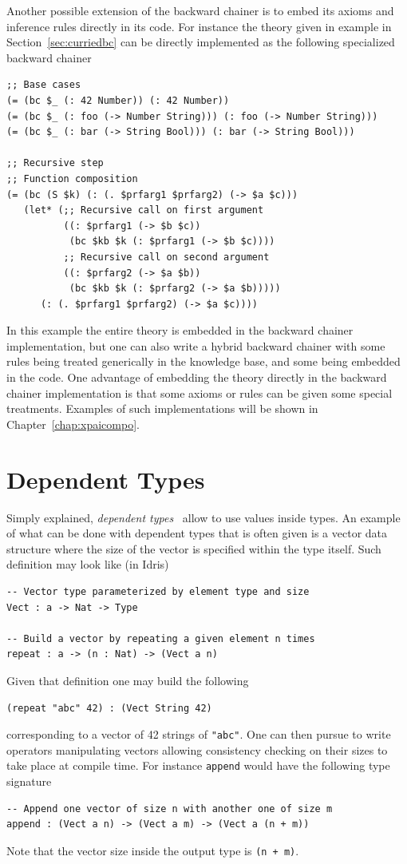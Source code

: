 \documentclass[]{report}
\begin{document}
Another possible extension of the backward chainer is to embed its
axioms and inference rules directly in its code.  For instance the
theory given in example in Section~\ref{sec:curriedbc} can be directly
implemented as the following specialized backward chainer

\begin{verbatim}
;; Base cases
(= (bc $_ (: 42 Number)) (: 42 Number))
(= (bc $_ (: foo (-> Number String))) (: foo (-> Number String)))
(= (bc $_ (: bar (-> String Bool))) (: bar (-> String Bool)))

;; Recursive step
;; Function composition
(= (bc (S $k) (: (. $prfarg1 $prfarg2) (-> $a $c)))
   (let* (;; Recursive call on first argument
          ((: $prfarg1 (-> $b $c))
           (bc $kb $k (: $prfarg1 (-> $b $c))))
          ;; Recursive call on second argument
          ((: $prfarg2 (-> $a $b))
           (bc $kb $k (: $prfarg2 (-> $a $b)))))
      (: (. $prfarg1 $prfarg2) (-> $a $c))))
\end{verbatim}
In this example the entire theory is embedded in the backward chainer
implementation, but one can also write a hybrid backward chainer with
some rules being treated generically in the knowledge base, and some
being embedded in the code.  One advantage of embedding the theory
directly in the backward chainer implementation is that some axioms or
rules can be given some special treatments.  Examples of such
implementations will be shown in Chapter~\ref{chap:xpaicompo}.

\section{Dependent Types}

Simply explained, \emph{dependent types}~\cite{MartinLof1980} allow to
use values inside types.  An example of what can be done with
dependent types that is often given is a vector data structure where
the size of the vector is specified within the type itself.  Such
definition may look like (in Idris)
\begin{verbatim}
-- Vector type parameterized by element type and size
Vect : a -> Nat -> Type

-- Build a vector by repeating a given element n times
repeat : a -> (n : Nat) -> (Vect a n)
\end{verbatim}
Given that definition one may build the following
\begin{verbatim}
(repeat "abc" 42) : (Vect String 42)
\end{verbatim}
corresponding to a vector of 42 strings of \texttt{"abc"}.
One can then pursue to write operators manipulating vectors allowing
consistency checking on their sizes to take place at compile time.
For instance \texttt{append} would have the following type
signature
\begin{verbatim}
-- Append one vector of size n with another one of size m
append : (Vect a n) -> (Vect a m) -> (Vect a (n + m))
\end{verbatim}
Note that the vector size inside the output type is
\texttt{(n + m)}.\\
\end{document}
